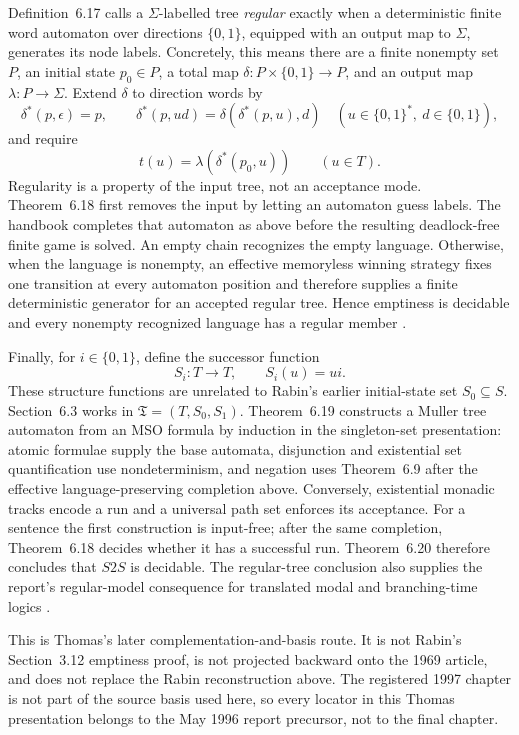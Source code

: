 Definition~6.17 calls a \(\Sigma\)-labelled tree \emph{regular} exactly when a
deterministic finite word automaton over directions \(\{0,1\}\), equipped with
an output map to \(\Sigma\), generates its node labels.  Concretely, this means
there are a finite nonempty set \(P\), an initial state \(p_0\in P\), a total
map \(\delta:P\times\{0,1\}\to P\), and an output map
\(\lambda:P\to\Sigma\).  Extend \(\delta\) to direction words by
\[
 \delta^*(p,\epsilon)=p,
 \qquad
 \delta^*(p,ud)=\delta(\delta^*(p,u),d)
 \quad(u\in\{0,1\}^*,\ d\in\{0,1\}),
\]
and require
\[
 t(u)=\lambda(\delta^*(p_0,u))\qquad(u\in T).
\]
Regularity is a property of
the input tree, not an acceptance mode.  Theorem~6.18 first removes the input
by letting an automaton guess labels.  The handbook completes that automaton as
above before the resulting deadlock-free finite game is solved.  An empty chain
recognizes the empty language.  Otherwise, when the language is nonempty, an
effective memoryless winning strategy fixes
one transition at every automaton position and therefore supplies a finite
deterministic generator for an accepted regular tree.  Hence emptiness is
decidable and every nonempty recognized language has a regular member
\cite[pp.~55--57]{Thomas1996Report}.

Finally, for \(i\in\{0,1\}\), define the successor function
\[
 S_i:T\longrightarrow T,
 \qquad S_i(u)=ui.
\]
These structure functions are unrelated to Rabin's earlier initial-state set
\(S_0\subseteq S\).  Section~6.3 works in
\(\mathfrak T=(T,S_0,S_1)\).  Theorem~6.19 constructs a Muller tree
automaton from an MSO formula by induction in the singleton-set presentation:
atomic formulae supply the base automata, disjunction and existential set
quantification use nondeterminism, and negation uses Theorem~6.9 after the
effective language-preserving completion above.  Conversely,
existential monadic tracks encode a run and a universal path set enforces its
acceptance.  For a sentence the first
construction is input-free; after the same completion, Theorem~6.18 decides
whether it has a successful run.  Theorem~6.20 therefore concludes that
\(S2S\) is decidable.
The regular-tree conclusion also supplies the report's regular-model
consequence for translated modal and branching-time logics
\cite[pp.~57--59]{Thomas1996Report}.

This is Thomas's later complementation-and-basis route.  It is not Rabin's
Section~3.12 emptiness proof, is not projected backward onto the 1969 article,
and does not replace the Rabin reconstruction above.  The registered 1997
chapter is not part of the source basis used here, so every locator in this
Thomas presentation belongs to the May 1996 report precursor, not to the final
chapter.

